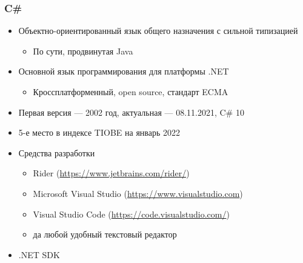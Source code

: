 \documentclass[xetex,mathserif,serif]{beamer}
\begin{document}
    \begin{frame}
        \frametitle{C\#}
        \begin{itemize}
            \item Объектно-ориентированный язык общего назначения с сильной типизацией
            \begin{itemize}
                \item По сути, продвинутая Java
            \end{itemize}
            \item Основной язык программирования для платформы .NET
            \begin{itemize}
                \item Кроссплатформенный, open source, стандарт ECMA
            \end{itemize}
            \item Первая версия --- 2002 год, актуальная --- 08.11.2021, C\# 10
            \item 5-е место в индексе TIOBE на январь 2022
            \item Средства разработки
            \begin{itemize}
                \item Rider (\url{https://www.jetbrains.com/rider/})
                \item Microsoft Visual Studio (\url{https://www.visualstudio.com})
                \item Visual Studio Code (\url{https://code.visualstudio.com/})
                \item да любой удобный текстовый редактор
            \end{itemize}
            \item .NET SDK
        \end{itemize}
    \end{frame}
\end{document}
